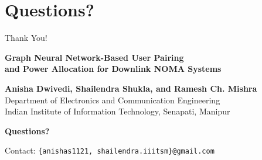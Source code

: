 \documentclass[aspectratio=169]{beamer}
\begin{document}
\section{Questions?}

\begin{frame}{Thank You!}
    \begin{center}
        \Large \textbf{Graph Neural Network-Based User Pairing\\and Power Allocation for Downlink NOMA Systems}
        
        \vspace{1cm}
        
        \normalsize
        \textbf{Anisha Dwivedi, Shailendra Shukla, and Ramesh Ch. Mishra}\\
        Department of Electronics and Communication Engineering\\
        Indian Institute of Information Technology, Senapati, Manipur
        
        \vspace{1cm}
        
        \Large \textbf{Questions?}
        
        \vspace{0.5cm}
        
        \normalsize
        Contact: \texttt{\{anishas1121, shailendra.iiitsm\}@gmail.com}
    \end{center}
\end{frame}
\end{document}
